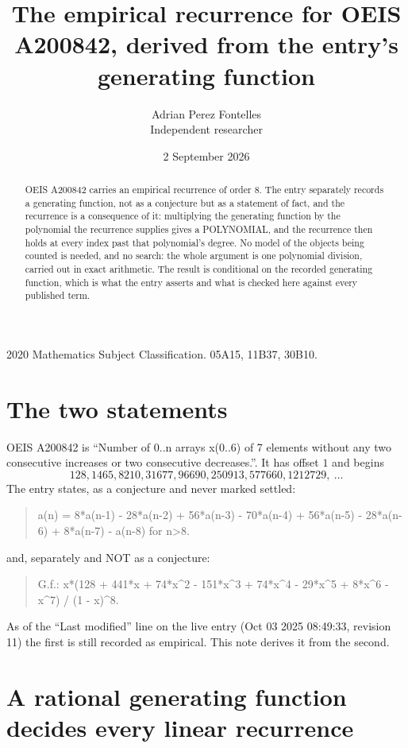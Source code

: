 \documentclass[11pt,a4paper]{article}
\title{The empirical recurrence for OEIS A200842, derived from the entry's generating function}
\author{Adrian Perez Fontelles\\ \small Independent researcher}
\date{2 September 2026}
\theoremstyle{plain}
\theoremstyle{definition}
\begin{document}
\maketitle

\begin{abstract}
OEIS A200842 carries an empirical recurrence of order $8$. The entry separately records a
generating function, not as a conjecture but as a statement of fact, and the recurrence is a
consequence of it: multiplying the generating function by the polynomial the recurrence
supplies gives a POLYNOMIAL, and the recurrence then holds at every index past that
polynomial's degree. No model of the objects being counted is needed, and no search: the
whole argument is one polynomial division, carried out in exact arithmetic. The result is
conditional on the recorded generating function, which is what the entry asserts and what is
checked here against every published term.
\end{abstract}

\noindent\small 2020 Mathematics Subject Classification. 05A15, 11B37, 30B10.\normalsize

\section{The two statements}

OEIS A200842 is ``Number of 0..n arrays x(0..6) of 7 elements without any two consecutive increases or two consecutive decreases.''. It has offset $1$ and begins
\[
128, 1465, 8210, 31677, 96690, 250913, 577660, 1212729,\ \dots
\]
The entry states, as a conjecture and never marked settled:
\begin{quote}
a(n) = 8*a(n-1) - 28*a(n-2) + 56*a(n-3) - 70*a(n-4) + 56*a(n-5) - 28*a(n-6) + 8*a(n-7) - a(n-8) for n>8.
\end{quote}
and, separately and NOT as a conjecture:
\begin{quote}
G.f.: x*(128 + 441*x + 74*x\^{}2 - 151*x\^{}3 + 74*x\^{}4 - 29*x\^{}5 + 8*x\^{}6 - x\^{}7) / (1 - x)\^{}8.
\end{quote}
As of the ``Last modified'' line on the live entry (Oct 03 2025 08:49:33, revision 11) the first is still
recorded as empirical. This note derives it from the second.

\section{A rational generating function decides every linear recurrence}
\end{document}
